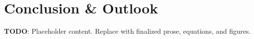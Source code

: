 
\section{Conclusion & Outlook}
\label{sec:conclusion-outlook}

\textbf{TODO}: Placeholder content. Replace with finalized prose, equations, and figures.

